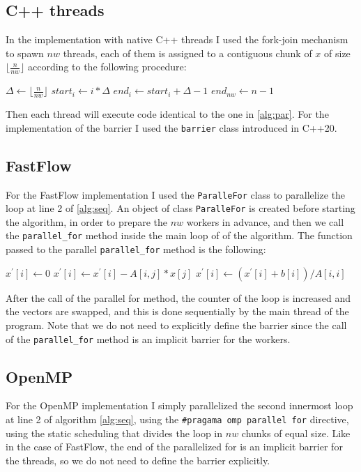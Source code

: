 \documentclass[12pt]{article}
\begin{document}
	\subsection{C++ threads}
	In the implementation with native C++ threads I used the fork-join mechanism to spawn $nw$ threads, each of them is assigned to a contiguous chunk of $x$ of size $\lfloor\frac{n}{nw}\rfloor$ according to the following procedure:
	\begin{algorithmic}
		\State $\Delta \gets \lfloor\frac{n}{nw}\rfloor$
			\State $start_i \gets i*\Delta$
			\State $end_i \gets start_i + \Delta - 1$
		\EndFor
		\State $end_{nw} \gets n-1$
	\end{algorithmic}
	Then each thread will execute code identical to the one in \ref{alg:par}. For the implementation of the barrier I used the \verb*|barrier| class introduced in C++20.
	\subsection{FastFlow}
	For the FastFlow implementation I used the \verb|ParalleFor| class to parallelize the loop at line 2 of \ref{alg:seq}. An object of class \verb|ParalleFor| is created before starting the algorithm, in order to prepare the $nw$ workers in advance, and then we call the \verb*|parallel_for| method inside the main loop of of the algorithm. The function passed to the parallel \verb*|parallel_for| method is the following:
	\begin{algorithmic}
		\Function{parallel\_for\_iteration}{$i$}
		\State $x^\prime[i] \gets 0$
		\For{$j \gets 0$ to  $n-1$}
		\If{$i \ne j$}
		\State $x^\prime[i] \gets x^\prime[i] - A[i,j]*x[j]$
		\EndIf
		\EndFor
		\State $x^\prime[i] \gets (x^\prime[i] + b[i])/A[i,i]$
		\EndFunction
	\end{algorithmic}
	After the call of the parallel for method, the counter of the loop is increased and the vectors are swapped, and this is done sequentially by the main thread of the program. Note that we do not need to explicitly define the barrier since the call of the \verb*|parallel_for| method is an implicit barrier for the workers. 
	\subsection{OpenMP}
	For the OpenMP implementation I simply parallelized the second innermost loop at line 2 of algorithm \ref{alg:seq}, using the \verb|#pragama omp parallel for| directive, using the static scheduling that divides the loop in $nw$ chunks of equal size. Like in the case of FastFlow, the end of the parallelized for is an implicit barrier for the threads, so we do not need to define the barrier explicitly.  
\end{document}
